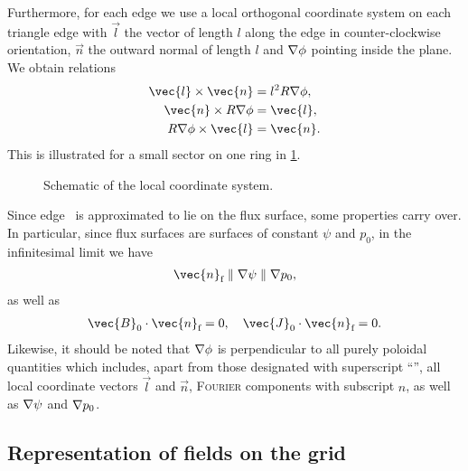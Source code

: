 Furthermore, for each edge we use a local orthogonal coordinate system on each triangle edge with $\vec{l}$ the vector of length $l$ along the edge in counter-clockwise orientation, $\vec{n}$ the outward normal of length $l$ and $\grad \phi$ pointing inside the plane. We obtain relations
\begin{align}
  \vec{l} \times \vec{n} &= l^{2} R \grad \phi, \label{eq:edge_phi} \\
  \vec{n} \times R \grad \phi &= \vec{l}, \label{eq:edge_l} \\
  R \grad \phi \times \vec{l} &= \vec{n}. \label{eq:edge_n}
\end{align}
This is illustrated for a small sector on one ring in \cref{fig:local_coordinates}.
\begin{figure}[bth]
  \centering
  
  \caption{Schematic of the local coordinate system.}
  \label{fig:local_coordinates}
\end{figure}

Since edge \fs\ is approximated to lie on the flux surface, some properties carry over. In particular, since flux surfaces are surfaces of constant $\psi$ and $p_{0}$, in the infinitesimal limit we have
\begin{gather}
  \vec{n}_{\fs} \parallel \grad \psi \parallel \grad p_{0},
\end{gather}
as well as
\begin{gather}
  \vec{B}_{0} \cdot \vec{n}_{\fs} = 0, \quad \vec{J}_{0} \cdot \vec{n}_{\fs} = 0.
\end{gather}
Likewise, it should be noted that $\grad \phi$ is perpendicular to all purely poloidal quantities which includes, apart from those designated with superscript \enquote{\pol}, all local coordinate vectors $\vec{l}$ and $\vec{n}$, \textsc{Fourier} components with subscript $n$, as well as $\nabla \psi$ and $\nabla p_{0}$.

\subsection{Representation of fields on the grid}
\label{sec:dofs}

